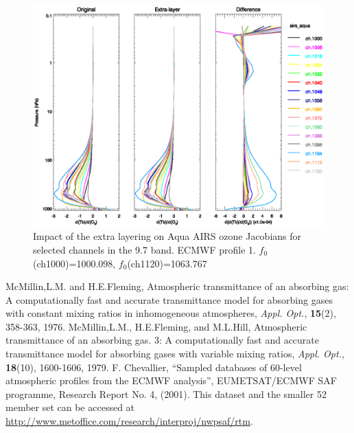 \begin{figure}[htp]
  \centering
  \includegraphics[scale=0.8]{graphics/airs_aqua.o3_k_el.p1.eps}
  \caption{Impact of the extra layering on Aqua AIRS ozone Jacobians for selected channels in the 9.7\micron{} \ozone{} band. ECMWF profile 1. $f_{0}$(ch1000)=1000.098\invcm, $f_{0}$(ch1120)=1063.767\invcm }
  \label{fig:airs_aqua.o3_k_el.p1}
\end{figure}


\begin{thebibliography}{99}
  McMillin,L.M. and H.E.Fleming, Atmospheric transmittance of an absorbing gas: A computationally fast and accurate transmittance model for absorbing gases with constant mixing ratios in inhomogeneous atmospheres, \emph{Appl. Opt.}, \textbf{15}(2), 358-363, 1976.
  McMillin,L.M., H.E.Fleming, and M.L.Hill, Atmospheric transmittance of an absorbing gas. 3: A computationally fast and accurate transmittance model for absorbing gases with variable mixing ratios, \emph{Appl. Opt.}, \textbf{18}(10), 1600-1606, 1979.
  F. Chevallier, ``Sampled databases of 60-level atmospheric profiles from the ECMWF analysis'', EUMETSAT/ECMWF SAF programme, Research Report No. 4, (2001). This dataset and the smaller 52 member set can be accessed at \href{http://www.metoffice.com/research/interproj/nwpsaf/rtm}{http://www.metoffice.com/research/interproj/nwpsaf/rtm}.
\end{thebibliography}


\begin{appendix}
\end{appendix}





